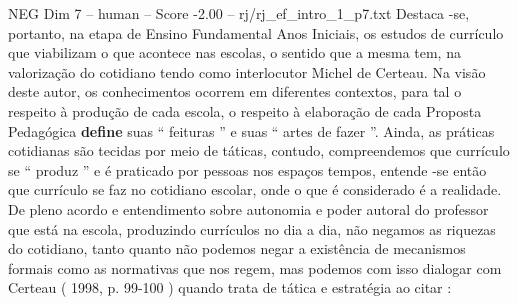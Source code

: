 \begin{textsample}{NEG Dim 7 – human – Score -2.00 – rj/rj\_ef\_intro\_1\_p7.txt}  \label{ex:f7_neg_014}
Destaca -se, portanto, na etapa de Ensino Fundamental Anos Iniciais, os estudos de currículo que viabilizam o que acontece nas escolas, o sentido que a mesma tem, na valorização do cotidiano tendo como interlocutor Michel de Certeau.
Na visão deste autor, os conhecimentos ocorrem em diferentes contextos, para tal o respeito à produção de cada escola, o respeito à elaboração de cada Proposta Pedagógica \textbf{define} suas “ feituras ” e suas “ artes de fazer ”.
Ainda, as práticas cotidianas são tecidas por meio de táticas, contudo, compreendemos que currículo se “ produz ” e é praticado por pessoas nos espaços tempos, entende -se então que currículo se faz no cotidiano escolar, onde o que é considerado é a realidade.
De pleno acordo e entendimento sobre autonomia e poder autoral do professor que está na escola, produzindo currículos no dia a dia, não negamos as riquezas do cotidiano, tanto quanto não podemos negar a existência de mecanismos formais como as normativas que nos regem, mas podemos com isso dialogar com Certeau ( 1998, p. 99-100 ) quando trata de tática e estratégia ao citar :

\end{textsample}
